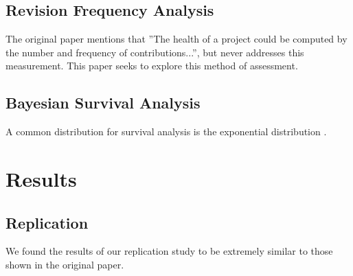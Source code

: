 \documentclass[acmconf]{acmart}
\begin{document}

\subsection{Revision Frequency Analysis}

The original paper mentions that ''The health of a project could be computed by the number and frequency of contributions...'', but never addresses this measurement.
This paper seeks to explore this method of assessment.


\subsection{Bayesian Survival Analysis}

A common distribution for survival analysis is the exponential distribution \cite{kelter2020bayesian, rethinking}.



\section{Results}

\subsection{Replication}

We found the results of our replication study to be extremely similar to those shown in the original paper.
\end{document}
